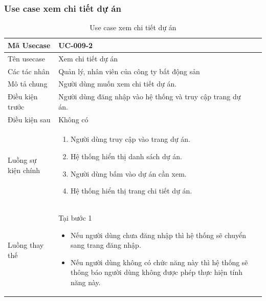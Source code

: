 \documentclass[12pt,a4paper]{article}
\begin{document}
    \subsubsection*{Use case xem chi tiết dự án }
    \begin{table}[H]
        \centering
        \begin{tabular}{|p{3.5cm}|p{11.5cm}|c|}
            \hline
            Mã Usecase      & UC-009-2                                                   \\
            \hline
            Tên usecase     & Xem chi tiết dự án                                         \\
            \hline
            Các tác nhân    & Quản lý, nhân viên của công ty bất động sản                \\
            \hline
            Mô tả chung     & Người dùng muốn xem chi tiết dự án.                        \\
            \hline

            Điều kiện trước & Người dùng đăng nhập vào hệ thống và truy cập trang dự án. \\
            \hline

            Điều kiện sau   & Không có                                                   \\
            \hline

            Luồng sự kiện chính & \vspace{-.8cm}\begin{enumerate}
                                                    \item Người dùng truy cập vào trang dự án.
                                                    \item Hệ thống hiển thị danh sách dự án.
                                                    \item Người dùng bấm vào dự án cần xem.
                                                    \item Hệ thống hiển thị trang chi tiết dự án.
            \end{enumerate}
            \\
            \hline
            Luồng thay thế & Tại bước 1\newline
            \vspace{-.8cm}\begin{itemize}
                              \item Nếu người dùng chưa đăng nhập thì hệ thống sẽ chuyển sang trang đăng nhập.
                              \item  Nếu người dùng không có chức năng này thì hệ thống sẽ thông báo người dùng không được phép thực hiện tính năng này.
            \end{itemize}

            \\    \hline
        \end{tabular}
        \caption{Use case xem chi tiết dự án }
    \end{table}
\end{document}
